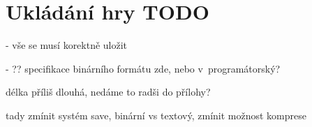
\section{Ukládání hry TODO}

- vše se musí korektně uložit

- ?? specifikace binárního formátu zde, nebo v~programátorský?

délka příliš dlouhá, nedáme to radši do přílohy?

tady zmínit systém save, binární vs textový, zmínit možnost komprese